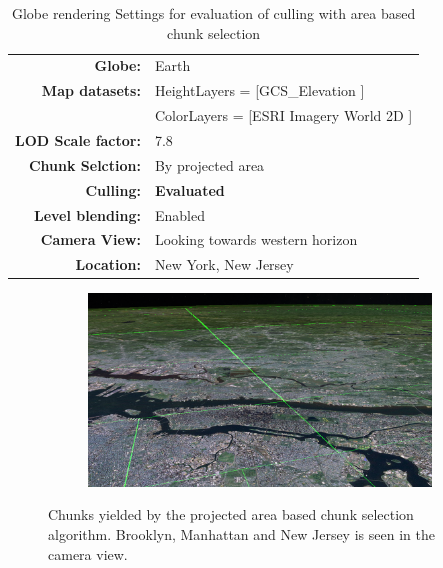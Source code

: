 \begin{table}[h]
  \centering
  \caption[]{Globe rendering Settings for evaluation of culling with area based chunk selection}
  \label{table:cullingasettings}
  \begin{tabular}{| r l |}
    \hline
      \textbf{Globe:}             & Earth \\
      \textbf{Map datasets:}      & HeightLayers = [GCS\_Elevation \cite{worldelevation3d}] \\
                                  & ColorLayers = [ESRI Imagery World 2D \cite{imageryworld2d}] \\
      \textbf{LOD Scale factor:}  & 7.8 \\
      \textbf{Chunk Selction:}    & By projected area \\
      \textbf{Culling:}           & \textbf{Evaluated} \\
      \textbf{Level blending:}    & Enabled \\
      \textbf{Camera View:}       & Looking towards western horizon\\
      \textbf{Location:}          & New York, New Jersey\\
    \hline
  \end{tabular}
\end{table}

\begin{figure}[h]
    \centering
    \begin{subfigure}[bt]{1.0\textwidth}
        \includegraphics[width=\textwidth]{figures/results/culling/cam_a.png}
    \end{subfigure}
    \caption{Chunks yielded by the projected area based chunk selection algorithm. Brooklyn, Manhattan and New Jersey is seen in the camera view.}
    \label{fig:cullingacam}
\end{figure}

